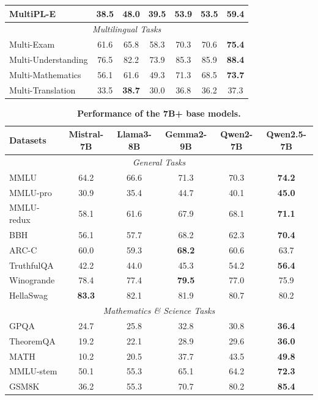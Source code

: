 \begin{table}[tbp]
\begin{tabular}{@{}lcccccc@{}}
MultiPL-E     & 38.5 & 48.0 & 39.5 & 53.9 & 53.5 & \textbf{59.4} \\
\midrule
\multicolumn{7}{c}{\textit{Multilingual Tasks}} \\
\midrule
Multi-Exam         & 61.6 & 65.8 & 58.3 & 70.3 & 70.6 & \textbf{75.4} \\
Multi-Understanding& 76.5 & 82.2 & 73.9 & 85.3 & 85.9 & \textbf{88.4} \\
Multi-Mathematics  & 56.1 & 61.6 & 49.3 & 71.3 & 68.5 & \textbf{73.7} \\
Multi-Translation  & 33.5 & \textbf{38.7} & 30.0 & 36.8 & 36.2 & 37.3 \\
\bottomrule
\end{tabular}
\end{table}


\begin{table}[tbp]
\centering
\caption{\textbf{Performance of the 7B+ base models.}}
\label{tab:base-7B}
\small
\begin{tabular}{@{}lccccc@{}}
\toprule
\textbf{Datasets} & \textbf{Mistral-7B} & \textbf{Llama3-8B} & \textbf{Gemma2-9B} & \textbf{Qwen2-7B} & \textbf{Qwen2.5-7B} \\
\midrule
\multicolumn{6}{c}{\textit{General Tasks}} \\
\midrule
MMLU & 64.2 & 66.6 & 71.3 & 70.3 & \textbf{74.2} \\
MMLU-pro & 30.9 & 35.4 & 44.7 & 40.1 & \textbf{45.0} \\
MMLU-redux & 58.1 & 61.6 & 67.9 & 68.1 & \textbf{71.1} \\
BBH & 56.1 & 57.7 & 68.2 & 62.3 & \textbf{70.4} \\
ARC-C & 60.0 & 59.3 & \textbf{68.2} & 60.6 & 63.7 \\
TruthfulQA & 42.2 & 44.0 & 45.3 & 54.2 & \textbf{56.4} \\
Winogrande & 78.4 & 77.4 & \textbf{79.5} & 77.0 & 75.9 \\
HellaSwag & \textbf{83.3} & 82.1 & 81.9 & 80.7 & 80.2 \\
\midrule
\multicolumn{6}{c}{\textit{Mathematics \& Science Tasks}} \\
\midrule
GPQA & 24.7 & 25.8 & 32.8 & 30.8 & \textbf{36.4} \\
TheoremQA & 19.2 & 22.1 & 28.9 & 29.6 & \textbf{36.0} \\
MATH & 10.2 & 20.5 & 37.7 & 43.5 & \textbf{49.8} \\
MMLU-stem & 50.1 & 55.3 & 65.1 & 64.2 & \textbf{72.3} \\
GSM8K & 36.2 & 55.3 & 70.7 & 80.2 & \textbf{85.4} \\

\end{tabular}
\end{table}
